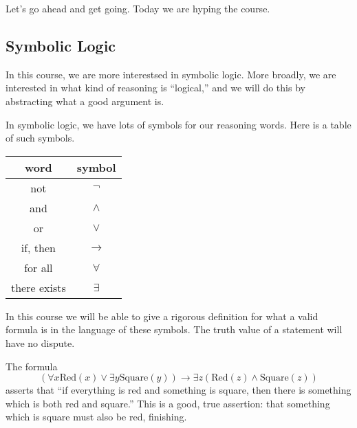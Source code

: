 





Let's go ahead and get going. Today we are hyping the course. 

\subsection{Symbolic Logic}
In this course, we are more interestsed in symbolic logic. More broadly, we are interested in what kind of reasoning is ``logical,'' and we will do this by abstracting what a good argument is.

In symbolic logic, we have lots of symbols for our reasoning words. Here is a table of such symbols.
\begin{center}
	\begin{tabular}{c|c}
		word & symbol \\\hline
		not & $\lnot$ \\
		and & $\land$ \\
		or & $\lor$ \\
		if, then & $\to$ \\
		for all & $\forall$ \\
		there exists & $\exists$
	\end{tabular}
\end{center}
In this course we will be able to give a rigorous definition for what a valid formula is in the language of these symbols. The truth value of a statement will have no dispute.
\begin{example}
	The formula
	\[(\forall x\text{Red}(x)\lor\exists y\text{Square}(y))\to\exists z(\text{Red}(z)\land\text{Square}(z))\]
	asserts that ``if everything is red and something is square, then there is something which is both red and square.'' This is a good, true assertion: that something which is square must also be red, finishing.
\end{example}

